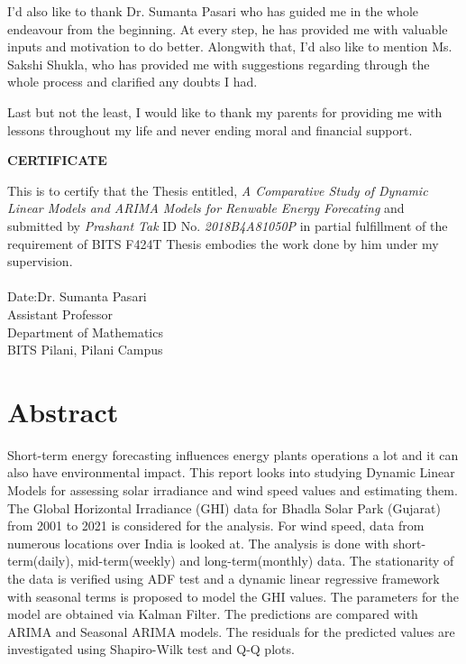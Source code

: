 \documentclass[a4paper,12pt]{article}
\begin{document}
I'd also like to thank Dr. Sumanta Pasari who has guided me in the whole endeavour from the beginning. At every step, he has provided me with valuable inputs and motivation to do better. Alongwith that, I'd also like to mention Ms. Sakshi Shukla, who has provided me with suggestions regarding through the whole process and clarified any doubts I had.

Last but not the least, I would like to thank my parents for providing me with lessons throughout my life and never ending moral and financial support.
\pagebreak

\thispagestyle{plain}
\begin{center}
    \large
    \textbf{CERTIFICATE}\\
\end{center}
This is to certify that the Thesis entitled, \emph{A Comparative Study of Dynamic Linear Models and ARIMA Models for Renwable Energy Forecating} and submitted by \emph{Prashant Tak} ID No. \emph{2018B4A81050P} in partial fulfillment of the requirement of BITS F424T Thesis embodies the work done by him under my supervision.\\
\vspace{1.5cm}\\
Date:\hspace*{\fill}Dr. Sumanta Pasari\\
\hspace*{\fill}Assistant Professor\\
\hspace*{\fill}Department of Mathematics\\
\hspace*{\fill}BITS Pilani, Pilani Campus\\
\pagebreak

\tableofcontents \clearpage

\section{Abstract}
\label{sec:org0fefb02}
Short-term energy forecasting influences energy plants operations a lot and it can also have environmental impact. This report looks into studying Dynamic Linear Models for assessing solar irradiance and wind speed values and estimating them. The Global Horizontal Irradiance (GHI) data for Bhadla Solar Park (Gujarat) from 2001 to 2021 is considered for the analysis. For wind speed, data from numerous locations over India is looked at. The analysis is done with short-term(daily), mid-term(weekly) and long-term(monthly) data. The stationarity of the data is verified using ADF test and a dynamic linear regressive framework with seasonal terms is proposed to model the GHI values. The parameters for the model are obtained via Kalman Filter. The predictions are compared with ARIMA and Seasonal ARIMA models. The residuals for the predicted values are investigated using Shapiro-Wilk test and Q-Q plots.
\pagebreak
\end{document}
